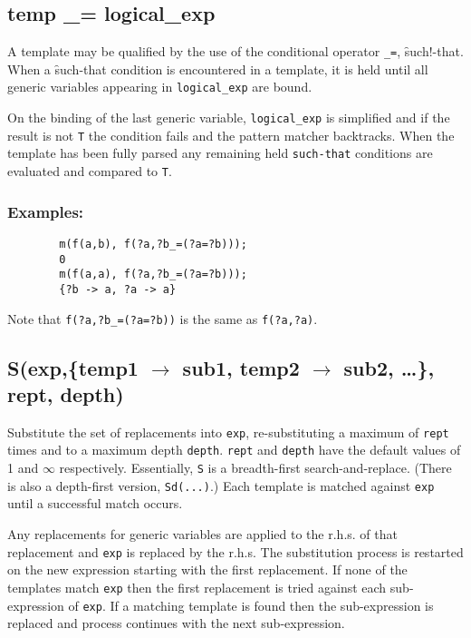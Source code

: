 \subsection{temp \_= logical\_exp}
\hypertarget{reserved:suchthatop}{}

A template may be qualified by the use of the conditional operator \texttt{\_=},
\f{such!-that}.  When a \f{such-that} condition is encountered in a template, it
is held until all generic variables appearing in \texttt{logical\_exp} are bound.

On the binding of the last generic variable, \texttt{logical\_exp} is simplified
and if the result is not \texttt{T} the condition fails and the pattern matcher
backtracks.  When the template has been fully parsed any remaining
held \texttt{such-that} conditions are evaluated and compared to \texttt{T}.

\subsubsection*{Examples:}

\begin{verbatim}
        m(f(a,b), f(?a,?b_=(?a=?b)));
        0
        m(f(a,a), f(?a,?b_=(?a=?b)));
        {?b -> a, ?a -> a}
\end{verbatim}
Note that \texttt{f(?a,?b\_=(?a=?b))} is the same as \texttt{f(?a,?a)}.


\subsection[S(exp,\{temp1 -> sub1, temp2 -> sub2, \ldots\}, rept, depth)]{S(exp,\{temp1 $\to$ sub1, temp2 $\to$ sub2, \ldots\}, rept, depth)}

Substitute the set of replacements into \texttt{exp}, re-substituting a maximum
of \texttt{rept} times and to a maximum depth \texttt{depth}. \texttt{rept} and
\texttt{depth} have the default values of 1 and $\infty$ respectively.
Essentially, \texttt{S} is a breadth-first search-and-replace.  (There is also a
depth-first version, \texttt{Sd(...)}.)  Each template is matched against
\texttt{exp} until a successful match occurs.

Any replacements for generic variables are applied to the r.h.s. of that
replacement and \texttt{exp} is replaced by the r.h.s.  The substitution process
is restarted on the new expression starting with the first replacement.  If none
of the templates match \texttt{exp} then the first replacement is tried against
each sub-expression of \texttt{exp}. If a matching template is found then the
sub-expression is replaced and process continues with the next sub-expression.

